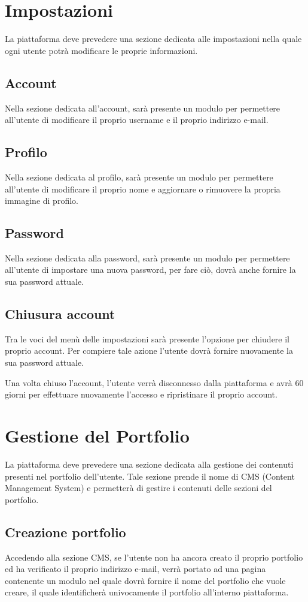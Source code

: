 \section{Impostazioni}
La piattaforma deve prevedere una sezione dedicata alle impostazioni nella quale ogni utente potr\`a modificare le proprie informazioni.
\subsection{Account}
Nella sezione dedicata all'account, sar\`a presente un modulo per permettere all'utente di modificare il proprio username e il proprio indirizzo e-mail.

\subsection{Profilo}
Nella sezione dedicata al profilo, sar\`a presente un modulo per permettere all'utente di modificare il proprio nome e aggiornare o rimuovere la propria immagine di profilo.

\subsection{Password}
Nella sezione dedicata alla password, sar\`a presente un modulo per permettere all'utente di impostare una nuova password, per fare ci\`o, dovr\`a anche fornire la sua password attuale.

\subsection{Chiusura account}
Tra le voci del men\`u delle impostazioni sar\`a presente l'opzione per chiudere il proprio account. Per compiere tale azione l'utente dovr\`a fornire nuovamente la sua password attuale.

Una volta chiuso l'account, l'utente verr\`a disconnesso dalla piattaforma e avr\`a 60 giorni per effettuare nuovamente l'accesso e ripristinare il proprio account.
\section{Gestione del Portfolio}
La piattaforma deve prevedere una sezione dedicata alla gestione dei contenuti presenti nel portfolio dell'utente. Tale sezione prende il nome di CMS (Content Management System) e permetter\`a
di gestire i contenuti delle sezioni del portfolio.
\subsection{Creazione portfolio}
Accedendo alla sezione CMS, se l'utente non ha ancora creato il proprio portfolio ed ha verificato il proprio indirizzo e-mail, verr\`a portato ad una pagina contenente un modulo nel quale dovr\`a fornire il nome del portfolio che vuole creare, il quale identificher\`a univocamente il portfolio all'interno piattaforma.


